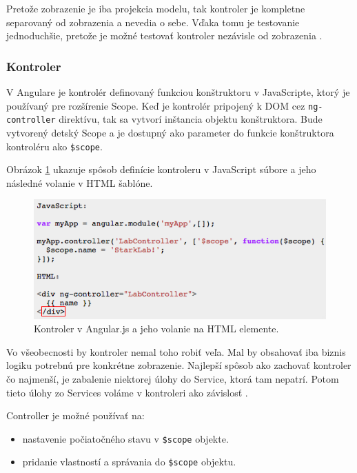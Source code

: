 Pretože zobrazenie je iba projekcia modelu, tak kontroler je kompletne separovaný od zobrazenia a nevedia o sebe. Vďaka tomu je testovanie jednoduchšie, pretože je možné testovať kontroler nezávisle od zobrazenia \cite{angular-docs}.

\subsubsection{Kontroler}
V Angulare je kontrolér definovaný funkciou konštruktoru v JavaScripte, ktorý je používaný pre rozšírenie Scope. Keď je kontrolér pripojený k DOM cez \verb|ng-controller| direktívu, tak sa vytvorí inštancia objektu konštruktora. Bude vytvorený detský Scope a je dostupný ako parameter do funkcie konštruktora kontroléru ako \verb|$scope|.

Obrázok \ref{img-angular-controller-def} ukazuje spôsob definície kontroleru v JavaScript súbore a jeho následné volanie v HTML šablóne.

\begin{figure}[H]
  \centering
  \includegraphics[scale=0.7]{img/code/angular-controller-def.png}
  \caption{Kontroler v Angular.js a jeho volanie na HTML elemente.}
  \label{img-angular-controller-def}
\end{figure}

Vo všeobecnosti by kontroler nemal toho robiť veľa. Mal by obsahovať iba biznis logiku potrebnú pre konkrétne zobrazenie. Najlepší spôsob ako zachovať kontroler čo najmenší, je zabalenie niektorej úlohy do Service, ktorá tam nepatrí. Potom tieto úlohy zo Services voláme v kontroleri ako závislosť \cite{angular-docs}.

\noindent Controller je možné používať na:
\begin{itemize}
\item nastavenie počiatočného stavu v \verb|$scope| objekte.
\item pridanie vlastností a správania do \verb|$scope| objektu.\\
\end{itemize}

